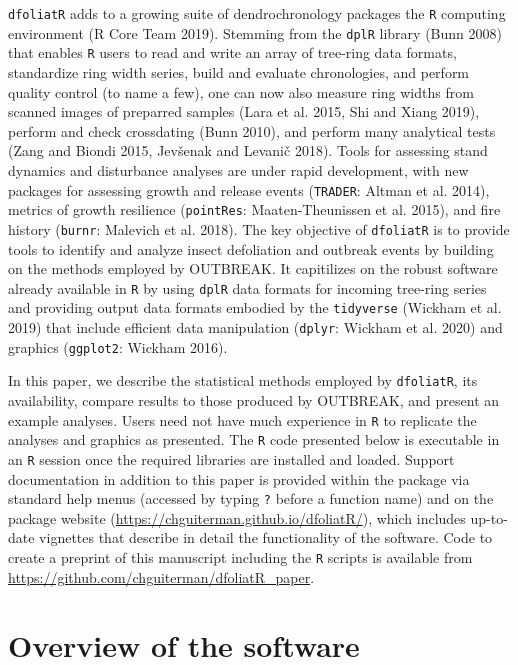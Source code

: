 \documentclass[review]{elsarticle} %
\begin{document}
\texttt{dfoliatR} adds to a growing suite of dendrochronology packages
the \texttt{R} computing environment (R Core Team 2019). Stemming from
the \texttt{dplR} library (Bunn 2008) that enables \texttt{R} users to
read and write an array of tree-ring data formats, standardize ring
width series, build and evaluate chronologies, and perform quality
control (to name a few), one can now also measure ring widths from
scanned images of preparred samples (Lara et al. 2015, Shi and Xiang
2019), perform and check crossdating (Bunn 2010), and perform many
analytical tests (Zang and Biondi 2015, Jevšenak and Levanič 2018).
Tools for assessing stand dynamics and disturbance analyses are under
rapid development, with new packages for assessing growth and release
events (\texttt{TRADER}: Altman et al. 2014), metrics of growth
resilience (\texttt{pointRes}: Maaten-Theunissen et al. 2015), and fire
history (\texttt{burnr}: Malevich et al. 2018). The key objective of
\texttt{dfoliatR} is to provide tools to identify and analyze insect
defoliation and outbreak events by building on the methods employed by
OUTBREAK. It capitilizes on the robust software already available in
\texttt{R} by using \texttt{dplR} data formats for incoming tree-ring
series and providing output data formats embodied by the
\texttt{tidyverse} (Wickham et al. 2019) that include efficient data
manipulation (\texttt{dplyr}: Wickham et al. 2020) and graphics
(\texttt{ggplot2}: Wickham 2016).

In this paper, we describe the statistical methods employed by
\texttt{dfoliatR}, its availability, compare results to those produced
by OUTBREAK, and present an example analyses. Users need not have much
experience in \texttt{R} to replicate the analyses and graphics as
presented. The \texttt{R} code presented below is executable in an
\texttt{R} session once the required libraries are installed and loaded.
Support documentation in addition to this paper is provided within the
package via standard help menus (accessed by typing \texttt{?} before a
function name) and on the package website
(\url{https://chguiterman.github.io/dfoliatR/}), which includes
up-to-date vignettes that describe in detail the functionality of the
software. Code to create a preprint of this manuscript including the
\texttt{R} scripts is available from
\url{https://github.com/chguiterman/dfoliatR_paper}.

\hypertarget{overview-of-the-software}{%
\section{Overview of the software}\label{overview-of-the-software}}
\end{document}
